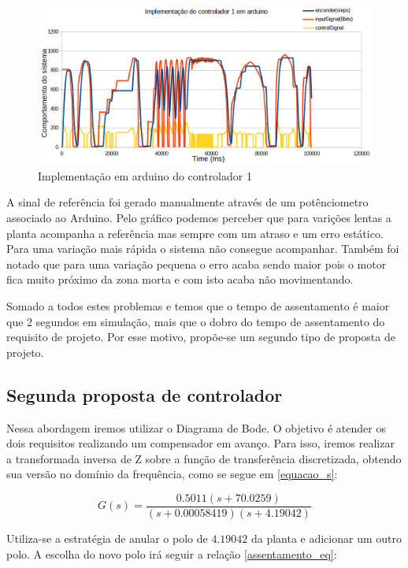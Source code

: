 \documentclass[a4paper,11pt]{article}
\begin{document}
\begin{figure}[H]
    \centering
    \includegraphics[width=\linewidth]{src/tex/img/resultado_controle_1_implem.PNG}
    \caption{Implementação em arduino do controlador 1}
    \label{fig:resultadoctrl1}
\end{figure}

A sinal de referência foi gerado manualmente através de um potênciometro associado ao Arduino. Pelo gráfico podemos perceber que para varições lentas a planta acompanha a referência mas sempre com um atraso e um erro estático. Para uma variação mais rápida o sistema não consegue acompanhar. Também foi notado que para uma variação pequena o erro acaba sendo maior pois o motor fica muito próximo da zona morta e com isto acaba não movimentando. 

Somado a  todos estes problemas e temos que o tempo de assentamento é maior que 2 segundos em simulação, mais que o dobro do tempo de assentamento do requisito de projeto. Por esse motivo, propõe-se um segundo tipo de proposta de projeto. 

\subsection{Segunda proposta de controlador}

Nessa abordagem iremos utilizar o Diagrama de Bode. O objetivo é atender os dois requisitos realizando um compensador em avanço. Para isso, iremos realizar a transformada inversa de Z sobre a função de transferência discretizada, obtendo sua versão no domínio da frequência, como se segue em \ref{equacao_s}:

\begin{equation}
G(s) = \frac{0.5011(s+70.0259)}{(s+0.00058419)(s+4.19042)}
\label{equacao_s}
\end{equation}

Utiliza-se a estratégia de anular o polo de $4.19042$ da planta e adicionar um outro polo. A escolha do novo polo irá seguir a relação \ref{assentamento_eq}:
\end{document}
